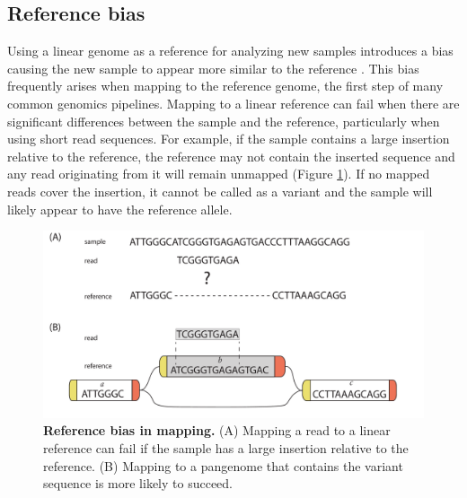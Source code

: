 \documentclass[11pt]{ucscthesis}
\begin{document}
\subsection{Reference bias}

Using a linear genome as a reference for analyzing new samples introduces a bias causing the new sample to appear more similar to the reference \cite{ballouz_is_2019,noauthor_computational_2016,eizenga_pangenome_2020}.
This bias frequently arises when mapping to the reference genome, the first step of many common genomics pipelines.
Mapping to a linear reference can fail when there are significant differences between the sample and the reference, particularly when using short read sequences.
For example, if the sample contains a large insertion relative to the reference, the reference may not contain the inserted sequence and any read originating from it will remain unmapped (Figure \ref{fig:mapping_example}).
If no mapped reads cover the insertion, it cannot be called as a variant and the sample will likely appear to have the reference allele.

\begin{figure}
    \centering
    \includegraphics[width=\columnwidth]{mapping_example.pdf}
    \caption[Reference bias in mapping]{\textbf{Reference bias in mapping.} (A) Mapping a read to a linear reference can fail if the sample has a large insertion relative to the reference. (B) Mapping to a pangenome that contains the variant sequence is more likely to succeed.}
    \label{fig:mapping_example}
\end{figure}
\end{document}
